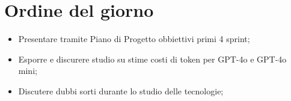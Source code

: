 

\section{Ordine del giorno}

\begin{itemize}
    \item Presentare tramite Piano di Progetto obbiettivi primi 4 sprint;
    \item Esporre e discurere studio su stime costi di token per GPT-4o e GPT-4o mini;
    \item Discutere dubbi sorti durante lo studio delle tecnologie;
\end{itemize}
